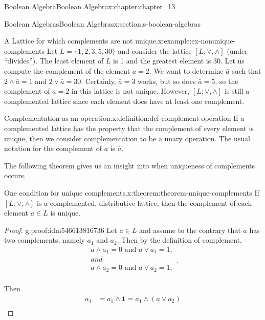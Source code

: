 \documentclass[oneside,10pt,]{book}
\numberwithin{equation}{section}
\begin{document}
\begin{chapterptx}{Boolean Algebra}{}{Boolean Algebra}{}{}{x:chapter:chapter_13}
\begin{sectionptx}{Boolean Algebras}{}{Boolean Algebras}{}{}{x:section:s-boolean-algebras}
\begin{example}{A Lattice for which complements are not unique.}{x:example:ex-nonunique-complements}%
Let \(L = \{1, 2, 3, 5, 30\}\) and consider the lattice \([L; \lor, \land ]\) (under ``divides''). The least element of \(L\) is 1 and the greatest element is 30. Let us compute the complement of the element \(a = 2\). We want to determine \(\bar{a}\) such that \(2 \land  \bar{a} = 1\) and \(2 \lor  \bar{a} = 30\). Certainly, \(\bar{a} = 3\) works, but so does \(\bar{a} = 5\), so the complement of \(a
= 2\) in this lattice is not unique. However, \([L; \lor  , \land ]\) is still a complemented lattice since each element does have at least one complement.%
\end{example}
\begin{definition}{Complementation as an operation.}{x:definition:def-complement-operation}%
%
\label{g:notation:idm546613821872}%
If a complemented lattice  has the property that the complement of every element is unique, then we consider complementation to be a unary operation.  The usual notation for the complement of \(a\) is \(\bar{a}\).%
\end{definition}
The following theorem gives us an insight into when uniqueness of complements occurs.%
\begin{theorem}{One condition for unique complements.}{}{x:theorem:theorem-unique-complements}%
If \([L; \lor ,\land ]\) is a complemented, distributive lattice, then the complement of each element \(a \in L\) is unique.%
\end{theorem}
\begin{proof}{}{g:proof:idm546613816736}
Let \(a \in  L\) and assume to the contrary that \(a\) has two complements, namely \(a_1\) and \(a_2\). Then by the definition of complement,%
\begin{equation*}
\begin{array}{c}
a \land  a_1 = 0\textrm{ and }a \lor  a_1 = 1, \\ 
and\\
a \land  a_2 = 0\textrm{ and }a \lor  a_2 = 1, \\
\end{array}\text{.}
\end{equation*}
%
\par
Then%
\begin{equation*}
\begin{split}
a_1 & =a_1 \land \pmb{1} = a_1 \land  \left(a \lor  a_2\right)\\

\end{split}
\end{equation*}
\end{proof}
\end{sectionptx}
\end{chapterptx}
\end{document}
